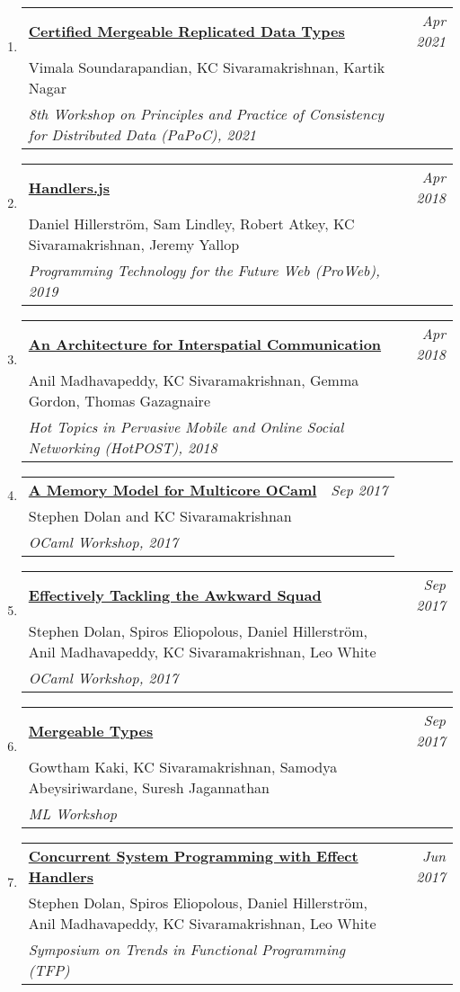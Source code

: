 \documentclass[10pt]{article}
\makeatletter
\newcommand{\lbar}[1]{{\color{#1}\ding{118}}\hspace*{2pt}}
\newenvironment{benumerate}[2]{
    \let\oldItem\item
    \def\item{\addtocounter{enumi}{-2}\oldItem}
    \begin{enumerate}[#2] \itemsep3pt
    \setcounter{enumi}{#1}
    \addtocounter{enumi}{1}}
  {\end{enumerate}}
\newenvironment{publication}[5]
{ \item
  \begin{tabular*}{7.5in}{p{6.3in}@{\extracolsep{\fill}}r}
    \href{#1}{\textbf{#2}} & \textit{#3}\\ #4 &\\ \textit{#5}&\\
  \end{tabular*}
} {}
\newenvironment{region}[3]{%
  \vspace*{0.5ex}
  {\scalebox{1.4}{\textbf{#1}}}
  \begin{benumerate}{#3}{\color{RoyalBlue}#2}}
  {\end{benumerate}\vspace{0.8ex}}
\makeatother
\begin{document}
\begin{region} {\lbar{purple}Workshop Publications}{{W}1}{23}
	\begin{publication}{http://kcsrk.info/papers/papoc21.pdf}
		{Certified Mergeable Replicated Data Types}
		{Apr 2021}{Vimala Soundarapandian, KC Sivaramakrishnan, Kartik Nagar}
		{8th Workshop on Principles and Practice of Consistency for Distributed Data (PaPoC), 2021}
	\end{publication}

	\begin{publication}{http://kcsrk.info/papers/handlers_js-proweb2018.pdf}
		{Handlers.js}
		{Apr 2018}{Daniel Hillerström, Sam Lindley, Robert Atkey, KC Sivaramakrishnan, Jeremy Yallop}
		{Programming Technology for the Future Web (ProWeb), 2019}
	\end{publication}

	\begin{publication}{http://kcsrk.info/papers/osmose_feb_18.pdf}
		{An Architecture for Interspatial Communication}
		{Apr 2018}{Anil Madhavapeddy, KC Sivaramakrishnan, Gemma Gordon, Thomas Gazagnaire}
    {Hot Topics in Pervasive Mobile and Online Social Networking (HotPOST), 2018}
  \end{publication}

  \begin{publication}{http://kcsrk.info/papers/memory_model_ocaml17.pdf}
    {A Memory Model for Multicore OCaml}
    {Sep 2017}{Stephen Dolan and KC Sivaramakrishnan}
    {OCaml Workshop, 2017}
  \end{publication}

  \begin{publication}{http://kcsrk.info/papers/awkward_effects_ml17.pdf}
    {Effectively Tackling the Awkward Squad}
    {Sep 2017}{Stephen Dolan, Spiros Eliopolous, Daniel Hillerström, Anil Madhavapeddy, KC Sivaramakrishnan, Leo White}
    {OCaml Workshop, 2017}
  \end{publication}

  \begin{publication}{http://kcsrk.info/papers/mergeable_types_ml17.pdf}
    {Mergeable Types}
    {Sep 2017}{Gowtham Kaki, KC Sivaramakrishnan, Samodya Abeysiriwardane, Suresh Jagannathan}
    {ML Workshop}
  \end{publication}

  \begin{publication}{http://kcsrk.info/papers/system_effects_feb_18.pdf}
    {Concurrent System Programming with Effect Handlers}
    {Jun 2017}{Stephen Dolan, Spiros Eliopolous, Daniel Hillerström, Anil Madhavapeddy, KC Sivaramakrishnan, Leo White}
    {Symposium on Trends in Functional Programming (TFP)}
  \end{publication}


\end{region}
\end{document}
